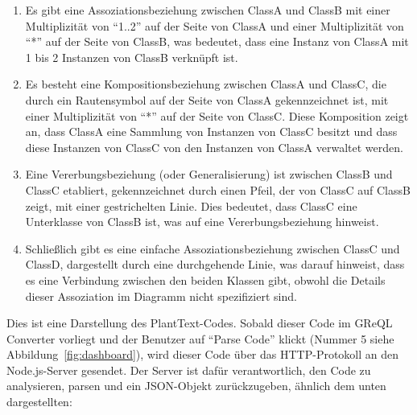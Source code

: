 \begin{enumerate}
    \item Es gibt eine Assoziationsbeziehung zwischen ClassA und ClassB mit einer Multiplizität von ``1..2'' auf der
Seite von ClassA und einer Multiplizität von ``*'' auf der Seite von ClassB, was bedeutet, dass eine Instanz von ClassA
mit 1 bis 2 Instanzen von ClassB verknüpft ist.
    \item Es besteht eine Kompositionsbeziehung zwischen ClassA und ClassC, die durch ein Rautensymbol auf der Seite von
ClassA gekennzeichnet ist, mit einer Multiplizität von ``*'' auf der Seite von ClassC. Diese Komposition zeigt an, dass
ClassA eine Sammlung von Instanzen von ClassC besitzt und dass diese Instanzen von ClassC von den Instanzen von ClassA
verwaltet werden.
    \item Eine Vererbungsbeziehung (oder Generalisierung) ist zwischen ClassB und ClassC etabliert, gekennzeichnet durch
einen Pfeil, der von ClassC auf ClassB zeigt, mit einer gestrichelten Linie. Dies bedeutet, dass ClassC eine Unterklasse
von ClassB ist, was auf eine Vererbungsbeziehung hinweist.
    \item Schließlich gibt es eine einfache Assoziationsbeziehung zwischen ClassC und ClassD, dargestellt durch eine
durchgehende Linie, was darauf hinweist, dass es eine Verbindung zwischen den beiden Klassen gibt, obwohl die Details
dieser Assoziation im Diagramm nicht spezifiziert sind.
\end{enumerate}


Dies ist eine Darstellung des PlantText-Codes. Sobald dieser Code im \gls{GReQL Converter} vorliegt und der Benutzer auf
``Parse Code'' klickt (Nummer 5 siehe Abbildung~\ref{fig:dashboard}), wird dieser Code über das HTTP-Protokoll an den
Node.js-Server gesendet. Der Server ist dafür verantwortlich, den Code zu analysieren, parsen und ein JSON-Objekt
zurückzugeben, ähnlich dem unten dargestellten:

